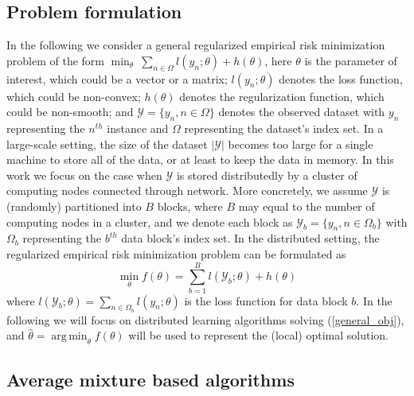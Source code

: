 \documentclass{article}
\DeclareMathOperator*{\argmin}{arg\,min}
\newcommand{\1}[0]{\ensuremath{\boldsymbol{1}}\xspace}
\begin{document}
\subsection{Problem formulation}\label{problem_formulation}
In the following we consider a general regularized empirical risk minimization problem of the form $\min_\theta ~ \sum_{n\in\Omega}l(y_n; \theta)+ h(\theta)$, here $\theta$ is the parameter of interest, which could be a vector or a matrix; $l(y_n; \theta)$ denotes the loss function, which could be non-convex; $h(\theta)$ denotes the regularization function, which could be non-smooth; and $\mathcal{Y} = \{y_n, n\in\Omega\}$ denotes the observed dataset with $y_n$ representing the $n^{th}$ instance and $\Omega$ representing the dataset's index set. In a large-scale setting, the size of the dataset $|\mathcal{Y}|$ becomes too large for a single machine to store all of the data, or at least to keep the data in memory. In this work we focus on the case when $\mathcal{Y}$ is stored distributedly by a cluster of computing nodes connected through network. More concretely, we assume $\mathcal{Y}$ is (randomly) partitioned into $B$ blocks, where $B$ may equal to the number of computing nodes in a cluster, and we denote each block as $\mathcal{Y}_b = \{y_n, n \in \Omega_b\}$ with $\Omega_b$ representing the $b^{th}$ data block's index set. In the distributed setting, the regularized empirical risk minimization problem can be formulated as
\begin{equation}\label{general_obj}
\textstyle\min_{\theta} f(\theta) = \sum_{b=1}^Bl(\mathcal{Y}_b; \theta)+h(\theta)
\end{equation}
where $l(\mathcal{Y}_b; \theta) = \sum_{n\in\Omega_b}l(y_n; \theta)$ is the loss function for data block $b$. In the following we will focus on distributed learning algorithms solving (\ref{general_obj}), and $\hat\theta = \argmin_\theta f(\theta)$ will be used to represent the (local) optimal solution.

\subsection{Average mixture based algorithms}\label{avgm}
\end{document}
